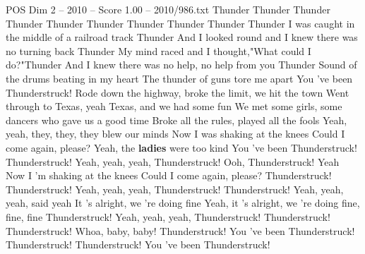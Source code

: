 \begin{textsample}{POS Dim 2 – 2010 – Score 1.00 – 2010/986.txt}  \label{ex:f2_pos_038}
Thunder Thunder Thunder Thunder Thunder Thunder Thunder Thunder Thunder Thunder I was caught in the middle of a railroad track Thunder And I looked round and I knew there was no turning back Thunder My mind raced and I thought,"What could I do?"Thunder And I knew there was no help, no help from you Thunder Sound of the drums beating in my heart The thunder of guns tore me apart You 've been Thunderstruck!
Rode down the highway, broke the limit, we hit the town Went through to Texas, yeah Texas, and we had some fun We met some girls, some dancers who gave us a good time Broke all the rules, played all the fools Yeah, yeah, they, they, they blew our minds Now I was shaking at the knees Could I come again, please?
Yeah, the \textbf{ladies} were too kind You 've been Thunderstruck!
Thunderstruck!
Yeah, yeah, yeah, Thunderstruck!
Ooh, Thunderstruck!
Yeah Now I 'm shaking at the knees Could I come again, please?
Thunderstruck!
Thunderstruck!
Yeah, yeah, yeah, Thunderstruck!
Thunderstruck!
Yeah, yeah, yeah, said yeah It 's alright, we 're doing fine Yeah, it 's alright, we 're doing fine, fine, fine Thunderstruck!
Yeah, yeah, yeah, Thunderstruck!
Thunderstruck!
Thunderstruck!
Whoa, baby, baby!
Thunderstruck!
You 've been Thunderstruck!
Thunderstruck!
Thunderstruck!
You 've been Thunderstruck!

\end{textsample}

